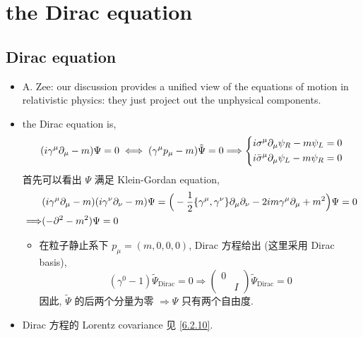 \chapter{the Dirac equation}
\section{Dirac equation}
\begin{itemize}
	\item A. Zee: our discussion provides a unified view of the equations of motion in relativistic physics: they just project out the unphysical components.
	
	\item the Dirac equation is,
	\begin{equation}
		(i \gamma^\mu \partial_\mu - m) \Psi = 0 \iff (\gamma^\mu p_\mu - m) \tilde{\Psi} = 0 \Longrightarrow \begin{dcases}
			i \sigma^\mu \partial_\mu \psi_R - m \psi_L = 0 \\
			i \bar{\sigma}^\mu \partial_\mu \psi_L - m \psi_R = 0
		\end{dcases}
	\end{equation}
	首先可以看出 $\Psi$ 满足 Klein-Gordan equation,
	\begin{align}
		& (i \gamma^\mu \partial_\mu - m) (i \gamma^\nu \partial_\nu - m) \Psi = \Big( - \frac{1}{2} \{\gamma^\mu, \gamma^\nu\} \partial_\mu \partial_\nu - 2 i m \gamma^\mu \partial_\mu + m^2 \Big) \Psi = 0 \notag \\
		\Longrightarrow & (- \partial^2 - m^2) \Psi = 0
	\end{align}
	\begin{itemize}
		\item 在粒子静止系下 $p_\mu = (m, 0, 0, 0)$, Dirac 方程给出 (这里采用 Dirac basis),
		\begin{equation}
			(\gamma^0 - 1) \tilde{\Psi}_\text{Dirac} = 0 \Longrightarrow \begin{pmatrix}
				0 & \\
				& I
			\end{pmatrix} \tilde{\Psi}_\text{Dirac} = 0
		\end{equation}
		因此, $\tilde{\Psi}$ 的后两个分量为零 $\Longrightarrow \Psi$ 只有两个自由度.
	\end{itemize}
	
	\item Dirac 方程的 Lorentz covariance 见 \eqref{6.2.10}.
\end{itemize}

